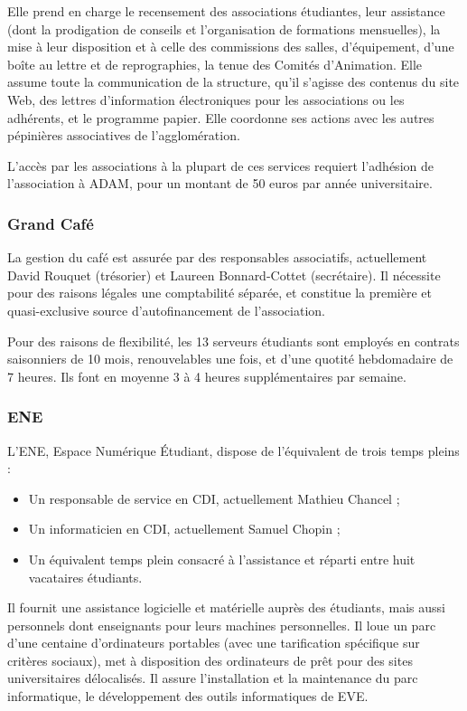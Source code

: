Elle prend en charge le recensement des associations étudiantes, leur assistance
(dont la prodigation de conseils et l'organisation de formations mensuelles),
la mise à leur disposition et à celle des commissions des salles, d'équipement,
d'une boîte au lettre et de reprographies, la tenue des Comités d'Animation.
Elle assume toute la communication de la structure, qu'il s'agisse des contenus
du site Web, des lettres d'information électroniques pour les associations ou
les adhérents, et le programme papier.
Elle coordonne ses actions avec les autres pépinières associatives de
l'agglomération.

L'accès par les associations à la plupart de ces services requiert l'adhésion
de l'association à ADAM, pour un montant de 50 euros par année universitaire.

\subsubsection{Grand Café}

La gestion du café est assurée par des responsables associatifs, actuellement
David Rouquet (trésorier) et Laureen Bonnard-Cottet (secrétaire).
Il nécessite pour des raisons légales une comptabilité séparée,
et constitue la première et quasi-exclusive source d'autofinancement de
l'association.

Pour des raisons de flexibilité, les 13 serveurs étudiants sont employés en
contrats saisonniers de 10 mois, renouvelables une fois, et d'une quotité
hebdomadaire de 7 heures. Ils font en moyenne 3 à 4 heures supplémentaires
par semaine.

\subsubsection{ENE}

L'ENE, Espace Numérique Étudiant, dispose de l'équivalent de trois
temps pleins :
\begin{itemize}
\item Un responsable de service en CDI, actuellement Mathieu Chancel ;
\item Un informaticien en CDI, actuellement Samuel Chopin ;
\item Un équivalent temps plein consacré à l'assistance et réparti
entre huit vacataires étudiants.
\end{itemize}


Il fournit une assistance logicielle et matérielle auprès des étudiants,
mais aussi personnels dont enseignants pour leurs machines personnelles.
Il loue un parc d'une centaine d'ordinateurs portables (avec une tarification
spécifique sur critères sociaux), met à disposition des ordinateurs de prêt pour
des sites universitaires délocalisés. Il assure l'installation et la maintenance
du parc informatique, le développement des outils informatiques de EVE.

